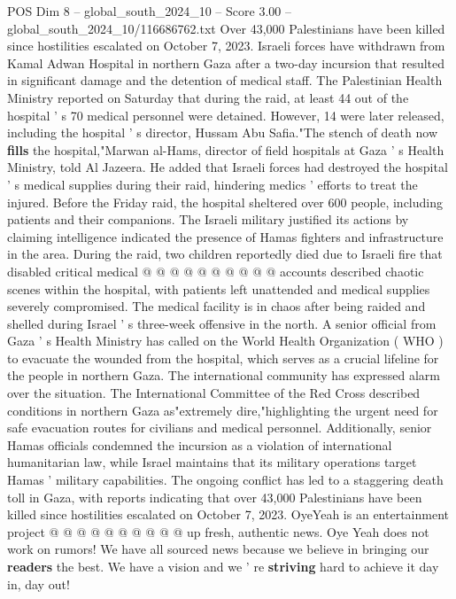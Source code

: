\begin{textsample}{POS Dim 8 – global\_south\_2024\_10 – Score 3.00 – global\_south\_2024\_10/116686762.txt}  \label{ex:f8_pos_309}
Over 43,000 Palestinians have been killed since hostilities escalated on October 7, 2023.
Israeli forces have withdrawn from Kamal Adwan Hospital in northern Gaza after a two-day incursion that resulted in significant damage and the detention of medical staff.
The Palestinian Health Ministry reported on Saturday that during the raid, at least 44 out of the hospital ' s 70 medical personnel were detained.
However, 14 were later released, including the hospital ' s director, Hussam Abu Safia."The stench of death now \textbf{fills} the hospital,"Marwan al-Hams, director of field hospitals at Gaza ' s Health Ministry, told Al Jazeera.
He added that Israeli forces had destroyed the hospital ' s medical supplies during their raid, hindering medics ' efforts to treat the injured.
Before the Friday raid, the hospital sheltered over 600 people, including patients and their companions.
The Israeli military justified its actions by claiming intelligence indicated the presence of Hamas fighters and infrastructure in the area.
During the raid, two children reportedly died due to Israeli fire that disabled critical medical @ @ @ @ @ @ @ @ @ @ accounts described chaotic scenes within the hospital, with patients left unattended and medical supplies severely compromised.
The medical facility is in chaos after being raided and shelled during Israel ' s three-week offensive in the north.
A senior official from Gaza ' s Health Ministry has called on the World Health Organization ( WHO ) to evacuate the wounded from the hospital, which serves as a crucial lifeline for the people in northern Gaza.
The international community has expressed alarm over the situation.
The International Committee of the Red Cross described conditions in northern Gaza as"extremely dire,"highlighting the urgent need for safe evacuation routes for civilians and medical personnel.
Additionally, senior Hamas officials condemned the incursion as a violation of international humanitarian law, while Israel maintains that its military operations target Hamas ' military capabilities.
The ongoing conflict has led to a staggering death toll in Gaza, with reports indicating that over 43,000 Palestinians have been killed since hostilities escalated on October 7, 2023.
OyeYeah is an entertainment project @ @ @ @ @ @ @ @ @ @ up fresh, authentic news.
Oye Yeah does not work on rumors!
We have all sourced news because we believe in bringing our \textbf{readers} the best.
We have a vision and we ' re \textbf{striving} hard to achieve it day in, day out!

\end{textsample}

